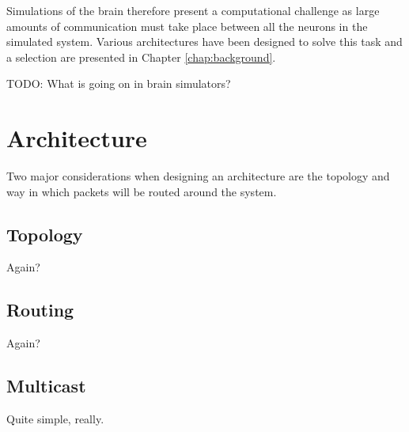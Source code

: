 			Simulations of the brain therefore present a computational challenge as
			large amounts of communication must take place between all the neurons
			in the simulated system. Various architectures have been designed to
			solve this task and a selection are presented in Chapter
			\ref{chap:background}.
			
			TODO: What is going on in brain simulators?
	
	\section{Architecture}
		
		Two major considerations when designing an architecture are the topology and
		way in which packets will be routed around the system.
		
		\subsection{Topology}
			
			Again?
		
		\subsection{Routing}
			
			Again?
		
		\subsection{Multicast}
			
			Quite simple, really.

